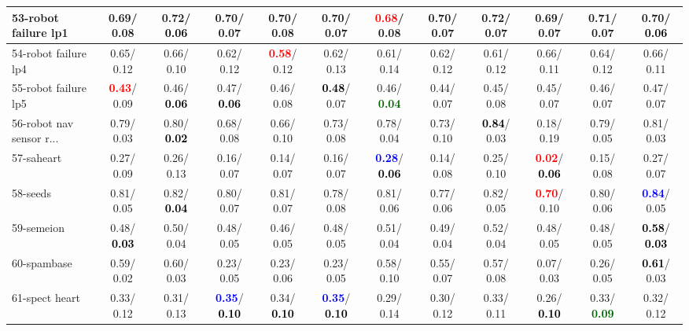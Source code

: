 \begin{table}[h]
\begin{center}
{\begin{tabular}{lc|c|c|c|c|c|c|c|c|c|c}
53-robot failure lp1 &   0.69/  0.08 &   0.72/\textcolor{black}{\textbf{  0.06}} &   0.70/  0.07 &   0.70/  0.08 &   0.70/  0.07 & \textcolor{red}{\textbf{  0.68}}/  0.08 &   0.70/  0.07 &   0.72/  0.07 &   0.69/  0.07 &   0.71/  0.07 &   0.70/\textcolor{black}{\textbf{  0.06}} \\ \hline
54-robot failure lp4 &   0.65/  0.12 &   0.66/  0.10 &   0.62/  0.12 & \textcolor{red}{\textbf{  0.58}}/  0.12 &   0.62/  0.13 &   0.61/  0.14 &   0.62/  0.12 &   0.61/  0.12 &   0.66/  0.11 &   0.64/  0.12 &   0.66/  0.11 \\
55-robot failure lp5 & \textcolor{red}{\textbf{  0.43}}/  0.09 &   0.46/\textcolor{black}{\textbf{  0.06}} &   0.47/\textcolor{black}{\textbf{  0.06}} &   0.46/  0.08 & \textcolor{black}{\textbf{  0.48}}/  0.07 &   0.46/\textcolor{darkgreen}{\textbf{  0.04}} &   0.44/  0.07 &   0.45/  0.08 &   0.45/  0.07 &   0.46/  0.07 &   0.47/  0.07 \\
56-robot nav sensor r... &   0.79/  0.03 &   0.80/\textcolor{black}{\textbf{  0.02}} &   0.68/  0.08 &   0.66/  0.10 &   0.73/  0.08 &   0.78/  0.04 &   0.73/  0.10 & \textcolor{black}{\textbf{  0.84}}/  0.03 &   0.18/  0.19 &   0.79/  0.05 &   0.81/  0.03 \\
57-saheart &   0.27/  0.09 &   0.26/  0.13 &   0.16/  0.07 &   0.14/  0.07 &   0.16/  0.07 & \textcolor{blue}{\textbf{  0.28}}/\textcolor{black}{\textbf{  0.06}} &   0.14/  0.08 &   0.25/  0.10 & \textcolor{red}{\textbf{  0.02}}/\textcolor{black}{\textbf{  0.06}} &   0.15/  0.08 &   0.27/  0.07 \\
58-seeds &   0.81/  0.05 &   0.82/\textcolor{black}{\textbf{  0.04}} &   0.80/  0.07 &   0.81/  0.07 &   0.78/  0.08 &   0.81/  0.06 &   0.77/  0.06 &   0.82/  0.05 & \textcolor{red}{\textbf{  0.70}}/  0.10 &   0.80/  0.06 & \textcolor{blue}{\textbf{  0.84}}/  0.05 \\
59-semeion &   0.48/\textcolor{black}{\textbf{  0.03}} &   0.50/  0.04 &   0.48/  0.05 &   0.46/  0.05 &   0.48/  0.05 &   0.51/  0.04 &   0.49/  0.04 &   0.52/  0.04 &   0.48/  0.05 &   0.48/  0.05 & \textcolor{black}{\textbf{  0.58}}/\textcolor{black}{\textbf{  0.03}} \\
60-spambase &   0.59/  0.02 &   0.60/  0.03 &   0.23/  0.05 &   0.23/  0.06 &   0.23/  0.05 &   0.58/  0.10 &   0.55/  0.07 &   0.57/  0.08 &   0.07/  0.03 &   0.26/  0.05 & \textcolor{black}{\textbf{  0.61}}/  0.03 \\ \hline
61-spect heart &   0.33/  0.12 &   0.31/  0.13 & \textcolor{blue}{\textbf{  0.35}}/\textcolor{black}{\textbf{  0.10}} &   0.34/\textcolor{black}{\textbf{  0.10}} & \textcolor{blue}{\textbf{  0.35}}/\textcolor{black}{\textbf{  0.10}} &   0.29/  0.14 &   0.30/  0.12 &   0.33/  0.11 &   0.26/\textcolor{black}{\textbf{  0.10}} &   0.33/\textcolor{darkgreen}{\textbf{  0.09}} &   0.32/  0.12 \\

\end{tabular}}
\end{center}
\end{table}
